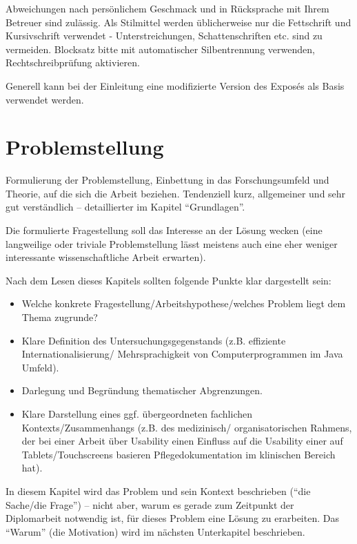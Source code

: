 Abweichungen nach persönlichem Geschmack und in Rücksprache mit Ihrem Betreuer sind zulässig. Als Stilmittel werden üblicherweise nur die Fettschrift und Kursivschrift verwendet - Unterstreichungen, Schattenschriften etc. sind zu vermeiden. Blocksatz bitte mit automatischer Silbentrennung verwenden, Rechtschreibprüfung aktivieren.

Generell kann bei der Einleitung eine modifizierte Version des Exposés als Basis verwendet werden.

\section{Problemstellung}

Formulierung der Problemstellung, Einbettung in das Forschungsumfeld und Theorie, auf die sich die Arbeit beziehen. Tendenziell kurz, allgemeiner und sehr gut verständlich -- detaillierter im Kapitel \enquote{Grundlagen}.

Die formulierte Fragestellung soll das Interesse an der Lösung wecken (eine langweilige oder triviale Problemstellung lässt meistens auch eine eher weniger interessante wissenschaftliche Arbeit erwarten).

Nach dem Lesen dieses Kapitels sollten folgende Punkte klar dargestellt sein:
\begin{itemize}
	\item Welche konkrete Fragestellung/Arbeitshypothese/welches Problem liegt dem Thema zugrunde?
	\item Klare Definition des Untersuchungsgegenstands (z.B. effiziente Internationalisierung/ Mehrsprachigkeit von Computerprogrammen im Java Umfeld).
	\item Darlegung und Begründung thematischer Abgrenzungen.
	\item Klare Darstellung eines ggf. übergeordneten fachlichen Kontexts/Zusammenhangs (z.B. des medizinisch/ organisatorischen Rahmens, der bei einer Arbeit über Usability einen Einfluss auf die Usability einer auf Tablets/Touchscreens basieren Pflegedokumentation im klinischen Bereich hat).
\end{itemize}

In diesem Kapitel wird das Problem und sein Kontext beschrieben (\enquote{die Sache/die Frage}) – nicht aber, warum es gerade zum Zeitpunkt der Diplomarbeit notwendig ist, für dieses Problem eine Lösung zu erarbeiten. Das \enquote{Warum} (die Motivation) wird im nächsten Unterkapitel beschrieben.

